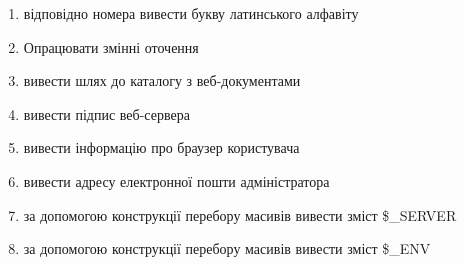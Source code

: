 \begin{enumerate}
\item відповідно номера вивести букву латинського алфавіту
\item[]Опрацювати змінні оточення 
\item вивести шлях до каталогу з веб-документами
\item вивести підпис веб-сервера
\item вивести інформацію про браузер користувача
\item вивести адресу електронної пошти адміністратора
\item за допомогою конструкції перебору масивів вивести зміст \$\_SERVER
\item за допомогою конструкції перебору масивів вивести зміст \$\_ENV

\end{enumerate}
